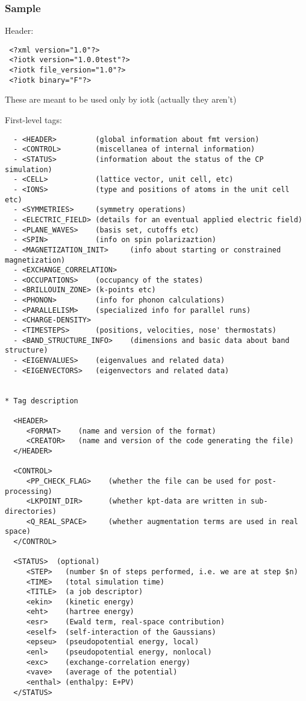 \documentclass[12pt,a4paper]{article}
\begin{document}
\subsubsection{Sample}
Header:
\begin{verbatim}
 <?xml version="1.0"?>
 <?iotk version="1.0.0test"?>
 <?iotk file_version="1.0"?>
 <?iotk binary="F"?> 
\end{verbatim}
These are meant to be used only by iotk (actually they aren't)

First-level tags:
\begin{verbatim}
  - <HEADER>         (global information about fmt version)
  - <CONTROL>        (miscellanea of internal information)
  - <STATUS>         (information about the status of the CP simulation)
  - <CELL>           (lattice vector, unit cell, etc)
  - <IONS>           (type and positions of atoms in the unit cell etc)
  - <SYMMETRIES>     (symmetry operations)
  - <ELECTRIC_FIELD> (details for an eventual applied electric field)
  - <PLANE_WAVES>    (basis set, cutoffs etc)
  - <SPIN>           (info on spin polarizaztion)
  - <MAGNETIZATION_INIT>     (info about starting or constrained magnetization)
  - <EXCHANGE_CORRELATION>
  - <OCCUPATIONS>    (occupancy of the states)
  - <BRILLOUIN_ZONE> (k-points etc)
  - <PHONON>         (info for phonon calculations)  
  - <PARALLELISM>    (specialized info for parallel runs)
  - <CHARGE-DENSITY>
  - <TIMESTEPS>      (positions, velocities, nose' thermostats)
  - <BAND_STRUCTURE_INFO>    (dimensions and basic data about band structure)
  - <EIGENVALUES>    (eigenvalues and related data)
  - <EIGENVECTORS>   (eigenvectors and related data)

  
* Tag description

  <HEADER> 
     <FORMAT>    (name and version of the format)
     <CREATOR>   (name and version of the code generating the file)
  </HEADER>

  <CONTROL>
     <PP_CHECK_FLAG>    (whether the file can be used for post-processing)
     <LKPOINT_DIR>      (whether kpt-data are written in sub-directories)
     <Q_REAL_SPACE>     (whether augmentation terms are used in real space)
  </CONTROL>

  <STATUS>  (optional)
     <STEP>   (number $n of steps performed, i.e. we are at step $n)
     <TIME>   (total simulation time)
     <TITLE>  (a job descriptor)
     <ekin>   (kinetic energy)
     <eht>    (hartree energy)
     <esr>    (Ewald term, real-space contribution)
     <eself>  (self-interaction of the Gaussians)
     <epseu>  (pseudopotential energy, local)
     <enl>    (pseudopotential energy, nonlocal)
     <exc>    (exchange-correlation energy)
     <vave>   (average of the potential)
     <enthal> (enthalpy: E+PV)
  </STATUS>


\end{verbatim}
\end{document}
